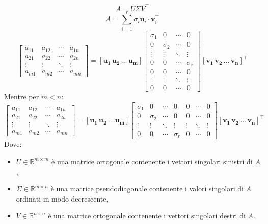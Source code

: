 \documentclass[11pt]{article}
\begin{document}
\[
A = U \Sigma V^\top      
\]
$$A = \sum_{i=1}^{r} \sigma_i \mathbf{u}_i \cdot \mathbf{v}_i^\top       $$
\[
\begin{bmatrix}
a_{11} & a_{12} & \cdots & a_{1n} \\
a_{21} & a_{22} & \cdots & a_{2n} \\
\vdots & \vdots & \ddots & \vdots \\
a_{m1} & a_{m2} & \cdots & a_{mn}
\end{bmatrix} = \mathbf{[u_1 \, u_2 \, \dots \, u_m]} \begin{bmatrix}
\sigma_1 & 0 & \cdots & 0 \\
0 & \sigma_2 & \cdots & 0 \\
\vdots & \vdots & \ddots & \vdots \\
0 & 0 & \cdots & \sigma_r \\
0 & 0 & \cdots & 0 \\
\vdots & \vdots & \ddots & \vdots \\
0 & 0 & \cdots & 0
\end{bmatrix} \mathbf{[v_1 \, v_2 \, \dots \, v_n]}^\top      
\]
Mentre per $m<n$:
\[
\begin{bmatrix}
a_{11} & a_{12} & \cdots & a_{1n} \\
a_{21} & a_{22} & \cdots & a_{2n} \\
\vdots & \vdots & \ddots & \vdots \\
a_{m1} & a_{m2} & \cdots & a_{mn}
\end{bmatrix} = \mathbf{[u_1 \, u_2 \, \dots \, u_m]}
\begin{bmatrix}
\sigma_1 & 0 & \cdots & 0 & 0 & \cdots & 0 \\
0 & \sigma_2 & \cdots & 0 & 0 & \cdots & 0 \\
\vdots & \vdots & \ddots & \vdots & \vdots & \ddots & \vdots \\
0 & 0 & \cdots & \sigma_r & 0 & \cdots & 0
\end{bmatrix} \mathbf{[v_1 \, v_2 \, \dots \, v_n]}^\top      
\]
Dove:
\begin{itemize}
    \item $U\in\mathbb{R}^{m\times m}$ è una matrice ortogonale contenente i vettori singolari sinistri di $A$,
    \item $\Sigma\in\mathbb{R}^{m\times n}$ è una matrice pseudodiagonale contenente i valori singolari di $A$ ordinati in modo decrescente,
    \item $V\in\mathbb{R}^{n\times n}$ è una matrice ortogonale contenente i vettori singolari destri di $A$.
\end{itemize}
\end{document}
